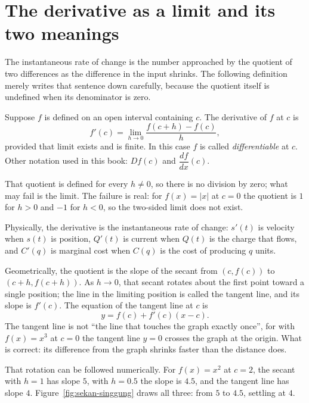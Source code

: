 \section{The derivative as a limit and its two meanings}

The instantaneous rate of change is the number approached by the quotient of two differences
as the difference in the input shrinks. The following definition merely writes that sentence
down carefully, because the quotient itself is undefined when its denominator is zero.


\begin{definisi}
Suppose $f$ is defined on an open interval containing $c$. The derivative of $f$ at $c$ is
\[
  f'(c)=\lim_{h\to0}\frac{f(c+h)-f(c)}{h},
\]
provided that limit exists and is finite. In this case $f$ is called
\emph{differentiable} at $c$. Other notation used in this book: $Df(c)$ and
$\dfrac{df}{dx}(c)$.
\end{definisi}

That quotient is defined for every $h\neq0$, so there is no division by zero; what may fail
is the limit. The failure is real: for $f(x)=|x|$ at $c=0$ the quotient is
$1$ for $h>0$ and $-1$ for $h<0$, so the two-sided limit does not exist.

Physically, the derivative is the instantaneous rate of change: $s'(t)$ is velocity when
$s(t)$ is position, $Q'(t)$ is current when $Q(t)$ is the charge that flows, and $C'(q)$ is
marginal cost when $C(q)$ is the cost of producing $q$ units.

Geometrically, the quotient is the slope of the secant from $(c,f(c))$ to
$(c+h,f(c+h))$. As $h\to0$, that secant rotates about the first point toward a single
position; the line in the limiting position is called the tangent line, and its slope is
$f'(c)$. The equation of the tangent line at $c$ is
\[
  y=f(c)+f'(c)(x-c).
\]
The tangent line is not ``the line that touches the graph exactly once'', for with
$f(x)=x^{3}$ at $c=0$ the tangent line $y=0$ crosses the graph at the origin. What is correct:
its difference from the graph shrinks faster than the distance does.

That rotation can be followed numerically. For $f(x)=x^{2}$ at $c=2$, the secant with $h=1$
has slope $5$, with $h=0.5$ the slope is $4.5$, and the tangent line has slope $4$.
Figure~\ref{fig:sekan-singgung} draws all three: from $5$ to $4.5$, settling at $4$.

